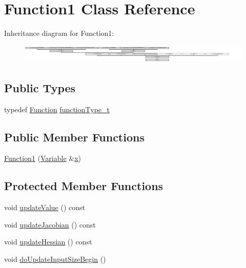 \hypertarget{classFunction1}{}\section{Function1 Class Reference}
\label{classFunction1}
Inheritance diagram for Function1\+:\begin{figure}[H]
\begin{center}
\leavevmode
\includegraphics[height=0.901771cm]{d1/d44/classFunction1}
\end{center}
\end{figure}
\subsection*{Public Types}
\begin{DoxyCompactItemize}
\item 
typedef \hyperlink{classocra_1_1Function}{Function} \hyperlink{classFunction1_a3248b79eedbe37ed0e285db564a530fe}{function\+Type\+\_\+t}
\end{DoxyCompactItemize}
\subsection*{Public Member Functions}
\begin{DoxyCompactItemize}
\item 
\hyperlink{classFunction1_a6b618d85fab472effe2624a8384c1674}{Function1} (\hyperlink{classocra_1_1Variable}{Variable} \&\hyperlink{classocra_1_1Function_a28825886d1f149c87b112ec2ec1dd486}{x})
\end{DoxyCompactItemize}
\subsection*{Protected Member Functions}
\begin{DoxyCompactItemize}
\item 
void \hyperlink{classFunction1_a95bc8ed2b08882cda37512e8f13fcba1}{update\+Value} () const
\item 
void \hyperlink{classFunction1_aff45595ff1b5fb4108e5313b31d3d774}{update\+Jacobian} () const
\item 
void \hyperlink{classFunction1_a1d88a2ebb5ad3cb35f7d40ab002b71f0}{update\+Hessian} () const
\item 
void \hyperlink{classFunction1_aec0bc51f050a1bd32cece26e524e5c97}{do\+Update\+Input\+Size\+Begin} ()
\end{DoxyCompactItemize}

